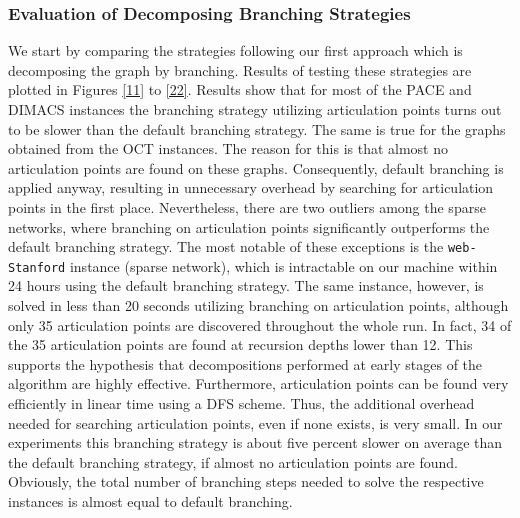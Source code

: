 \documentclass[12pt,a4paper,twoside]{scrartcl}
\numberwithin{equation}{section}
\begin{document}
\subsubsection{Evaluation of Decomposing Branching Strategies}
We start by comparing the strategies following our first approach which is decomposing the graph by branching. Results of testing these strategies are plotted in Figures \ref{11} to \ref{22}. Results show that for most of the PACE and DIMACS instances the branching strategy utilizing articulation points turns out to be slower than the default branching strategy. The same is true for the graphs obtained from the OCT instances. The reason for this is that almost no articulation points are found on these graphs. Consequently, default branching is applied anyway, resulting in unnecessary overhead by searching for articulation points in the first place. Nevertheless, there are two outliers among the sparse networks, where branching on articulation points significantly outperforms the default branching strategy. The most notable of these exceptions is the \texttt{web-Stanford} instance (sparse network), which is intractable on our machine within 24 hours using the default branching strategy. The same instance, however, is solved in less than 20 seconds utilizing branching on articulation points, although only 35 articulation points are discovered throughout the whole run. In fact, 34 of the 35 articulation points are found at recursion depths lower than 12. This supports the hypothesis that decompositions performed at early stages of the algorithm are highly effective. Furthermore, articulation points can be found very efficiently in linear time using a DFS scheme. Thus, the additional overhead needed for searching articulation points, even if none exists, is very small. In our experiments this branching strategy is about five percent slower on average than the default branching strategy, if almost no articulation points are found. Obviously, the total number of branching steps needed to solve the respective instances is almost equal to default branching. 
\end{document}
